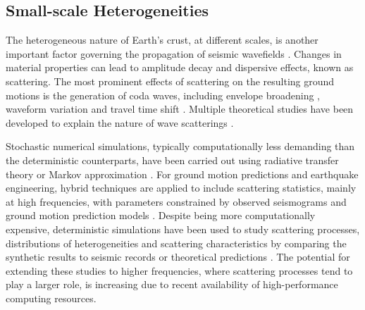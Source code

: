 \subsection{Small-scale Heterogeneities}

The heterogeneous nature of Earth's crust, at different scales, is another important factor governing the propagation of seismic wavefields \citep{levanderSmallscaleHeterogeneityLargescale1992,levanderCrustHeterogeneousOptical1994,beanStatisticalMeasuresCrustal1999,helffrichEarthMantle2001,hedlinSeismicEvidenceSmallscale1997}. Changes in material properties can lead to amplitude decay and dispersive effects, known as scattering. The most prominent effects of scattering on the resulting ground motions is the generation of coda waves, including envelope broadening \citep{satoBroadeningSeismogramEnvelopes1989}, waveform variation and travel time shift \citep{flatteSmallscaleStructureLithosphere1988}. Multiple theoretical studies have been developed to explain the nature of wave scatterings \citep{akiAnalysisSeismicCoda1969, wuMultipleScatteringEnergy1985,akiOriginCodaWaves1975,zengScatteringWaveEnergy1991,zengTheoryScatteredSwave1993,zengSubeventRakeRandom1995}.

Stochastic numerical simulations, typically computationally less demanding than the deterministic counterparts, have been carried out using radiative transfer theory \citep{gusevSimulatedEnvelopesNonisotropically1996,przybillaRadiativeTransferElastic2006} or Markov approximation \citep{saitoEnvelopeBroadeningSpherically2002,sawazakiEnvelopeSynthesisShortperiod2011}. For ground motion predictions and earthquake engineering, hybrid techniques are applied to include scattering statistics, mainly at high frequencies, with parameters constrained by observed seismograms and ground motion prediction models \citep{liuPredictionBroadbandGroundMotion2006,gravesBroadbandGroundMotionSimulation2010, maiHybridBroadbandGroundMotion2010}.
Despite being more computationally expensive, deterministic simulations have been used to study scattering processes, distributions of heterogeneities and scattering characteristics by comparing the synthetic results to seismic records or theoretical predictions \citep{frankelFiniteDifferenceSimulations1986,rothSingleScatteringTheory1993,shapiroSeismicAttenuationScattering1993,thyboSeismicScatteringTop2003}. The potential for extending these studies to higher frequencies, where scattering processes tend to play a larger role, is increasing due to recent availability of high-performance computing resources.


